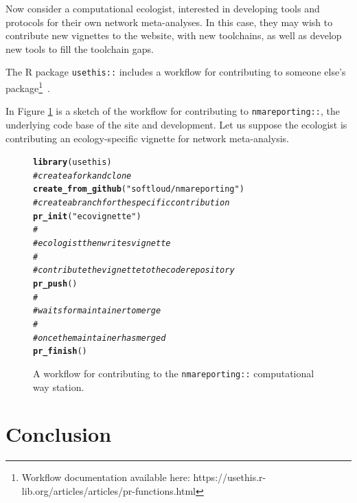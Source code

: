 \documentclass[12pt]{article}\usepackage[]{graphicx}\usepackage[]{color}
\makeatletter
\newcommand{\hlstr}[1]{\textcolor[rgb]{0.192,0.494,0.8}{#1}}%
\newcommand{\hlcom}[1]{\textcolor[rgb]{0.678,0.584,0.686}{\textit{#1}}}%
\newcommand{\hlstd}[1]{\textcolor[rgb]{0.345,0.345,0.345}{#1}}%
\newcommand{\hlkwd}[1]{\textcolor[rgb]{0.737,0.353,0.396}{\textbf{#1}}}%
\newenvironment{kframe}{%
 \def\at@end@of@kframe{}%
 \ifinner\ifhmode%
  \def\at@end@of@kframe{\end{minipage}}%
  \begin{minipage}{\columnwidth}%
 \fi\fi%
 \def\FrameCommand##1{\hskip\@totalleftmargin \hskip-\fboxsep
 \colorbox{shadecolor}{##1}\hskip-\fboxsep
     \hskip-\linewidth \hskip-\@totalleftmargin \hskip\columnwidth}%
 \MakeFramed {\advance\hsize-\width
   \@totalleftmargin\z@ \linewidth\hsize
   \@setminipage}}%
 {\par\unskip\endMakeFramed%
 \at@end@of@kframe}
\newenvironment{knitrout}{}{} %
\newcommand{\package}[1]{\texttt{{#1::}}}
\makeatother
\begin{document}
Now consider a computational ecologist, interested in developing tools and protocols for their own network meta-analyses. In this case, they may wish to contribute new vignettes to the website, with new toolchains, as well as develop new tools to fill the toolchain gaps.

The R package \package{usethis} includes a workflow for contributing to someone else's package\footnote{Workflow documentation available here: https://usethis.r-lib.org/articles/articles/pr-functions.html}~\cite{wickham_usethis:_2019}.

In Figure \ref{fig:workflow} is a sketch of the workflow for contributing to \package{nmareporting}, the underlying code base of the site and development. Let us suppose the ecologist is contributing an ecology-specific vignette for network meta-analysis.

\begin{figure}

\begin{knitrout}
\color{fgcolor}\begin{kframe}
\begin{alltt}
\hlkwd{library}\hlstd{(usethis)}
\hlcom{# create a fork and clone}
\hlkwd{create_from_github}\hlstd{(}\hlstr{"softloud/nmareporting"}\hlstd{)}
\hlcom{# create a branch for the specific contribution}
\hlkwd{pr_init}\hlstd{(}\hlstr{"ecovignette"}\hlstd{)}
\hlcom{#}
\hlcom{# ecologist then writes vignette}
\hlcom{#}
\hlcom{# contribute the vignette to the code repository}
\hlkwd{pr_push}\hlstd{()}
\hlcom{#}
\hlcom{# waits for maintainer to merge}
\hlcom{#}
\hlcom{# once the maintainer has merged}
\hlkwd{pr_finish}\hlstd{()}
\end{alltt}
\end{kframe}
\end{knitrout}

\caption{A workflow for contributing to the \package{nmareporting} computational way station.}
\label{fig:workflow}
\end{figure}

\section{Conclusion}




\end{document}
